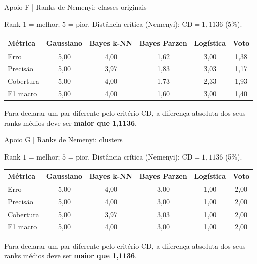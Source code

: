 \documentclass[aspectratio=169,11pt]{beamer}
\begin{document}
\begin{frame}[t]{Apoio F | Ranks de Nemenyi: classes originais}

\small Rank $1$ = melhor; $5$ = pior. Distância crítica (Nemenyi): $\mathrm{CD}=1,1136$ (5\%).\vspace{3mm}
\par
\scriptsize
\renewcommand{\arraystretch}{1.65}
\setlength{\tabcolsep}{4pt}
\centering
\begin{tabular}{lccccc}
\toprule
Métrica & Gaussiano & Bayes k-NN & Bayes Parzen & Logística & Voto \\
\midrule
Erro & 5,00 & 4,00 & 1,62 & 3,00 & 1,38 \\
Precisão & 5,00 & 3,97 & 1,83 & 3,03 & 1,17 \\
Cobertura & 5,00 & 4,00 & 1,73 & 2,33 & 1,93 \\
F1 macro & 5,00 & 4,00 & 1,60 & 3,00 & 1,40 \\
\bottomrule
\end{tabular}
\par
\vspace{3mm}\begin{notabox}\small Para declarar um par diferente pelo critério CD, a diferença absoluta dos seus ranks médios deve ser \textbf{maior que 1,1136}.\end{notabox}

\end{frame}

\begin{frame}[t]{Apoio G | Ranks de Nemenyi: clusters}

\small Rank $1$ = melhor; $5$ = pior. Distância crítica (Nemenyi): $\mathrm{CD}=1,1136$ (5\%).\vspace{3mm}
\par
\scriptsize
\renewcommand{\arraystretch}{1.65}
\setlength{\tabcolsep}{4pt}
\centering
\begin{tabular}{lccccc}
\toprule
Métrica & Gaussiano & Bayes k-NN & Bayes Parzen & Logística & Voto \\
\midrule
Erro & 5,00 & 4,00 & 3,00 & 1,00 & 2,00 \\
Precisão & 5,00 & 4,00 & 3,00 & 1,00 & 2,00 \\
Cobertura & 5,00 & 3,97 & 3,03 & 1,00 & 2,00 \\
F1 macro & 5,00 & 4,00 & 3,00 & 1,00 & 2,00 \\
\bottomrule
\end{tabular}
\par
\vspace{3mm}\begin{notabox}\small Para declarar um par diferente pelo critério CD, a diferença absoluta dos seus ranks médios deve ser \textbf{maior que 1,1136}.\end{notabox}

\end{frame}
\end{document}
